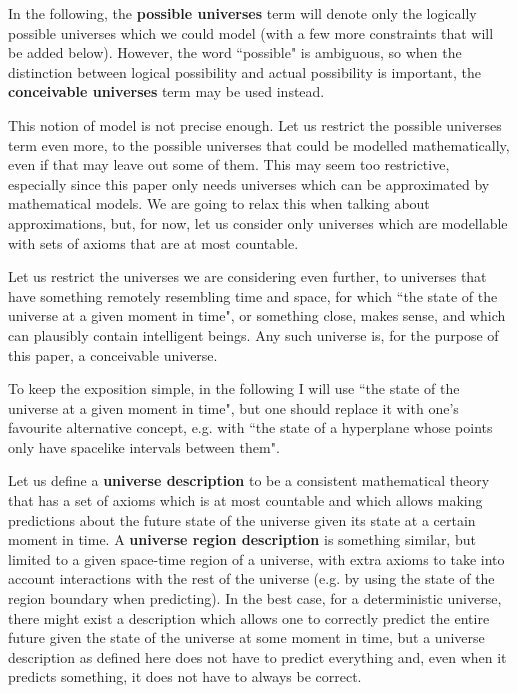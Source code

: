 \documentclass[a4paper
,draft
]{article}
\newcommand{\definitie}[1]{\textbf{#1}}
\newcommand{\ghilimele}[1]{``#1"}
\begin{document}
In the following, the \definitie{possible universes} term will denote
only the logically possible universes which we could model (with a few
more constraints that will be added below). However, the word
\ghilimele{possible} is ambiguous, so when the distinction between logical
possibility and actual possibility is important, the
\definitie{conceivable universes} term may be used instead.

This notion of model is not precise enough.
Let us restrict the possible universes term even more,
to the possible universes that could be modelled mathematically,
even if that may leave out some of them.
This may seem too restrictive,
especially since this paper only needs universes which can be approximated
by mathematical models.
We are going to relax this when talking about approximations, but, for now,
let us consider only universes
which are modellable with sets of axioms that are at most countable.

Let us restrict the universes we are considering even further, to universes that
have something remotely resembling time and space, for which
\ghilimele{the state of the universe at a given moment in time}, or something
close, makes sense, and which can plausibly contain intelligent beings.
Any such universe is, for the purpose of this paper, a conceivable universe.

To keep the exposition simple, in the following I will use
\ghilimele{the state of the universe at a given moment in time},
but one should replace it with one's favourite alternative concept, e.g.
with \ghilimele{the state of a hyperplane whose points only have spacelike
intervals between them}.

Let us define a \definitie{universe description} to be a
consistent mathematical theory that has
a set of axioms which is at most countable and which allows making
predictions about the future state of the universe given its state
at a certain moment in time. A \definitie{universe region description}
is something similar, but limited to a given space-time region of a universe,
with extra axioms to take into account interactions with the rest of the
universe (e.g. by using the state of the region boundary when predicting).
In the best case, for a deterministic universe, there might exist
a description which allows one to correctly predict the entire future
given the state of the universe at some moment in time,
but a universe description
as defined here does not have to predict everything and,
even when it predicts something, it does not have to always be correct.
\end{document}
